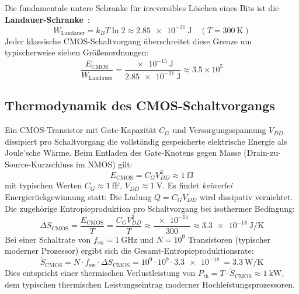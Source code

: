 ﻿\documentclass[12pt, a4paper]{report}
\theoremstyle{definition}
\theoremstyle{remark}
\begin{document}
Die fundamentale untere Schranke für irreversibles Löschen eines Bits ist
die \textbf{Landauer-Schranke}~\cite{landauer1961}:
\begin{equation}
  W_\text{Landauer} = k_B T \ln 2
  \approx \SI{2.85e-21}{\joule}
  \quad (T = \SI{300}{\kelvin})
  \label{eq:landauer}
\end{equation}
Jeder klassische CMOS-Schaltvorgang überschreitet diese Grenze um typischerweise
sieben Größenordnungen:
\begin{equation}
  \frac{E_\text{CMOS}}{W_\text{Landauer}}
  = \frac{\SI{e-15}{\joule}}{\SI{2.85e-21}{\joule}}
  \approx 3.5 \times 10^5
  \label{eq:cmos_landauer_ratio}
\end{equation}

\subsection{Thermodynamik des CMOS-Schaltvorgangs}

Ein CMOS-Transistor mit Gate-Kapazität $C_G$ und Versorgungsspannung $V_{DD}$
dissipiert pro Schaltvorgang die vollständig gespeicherte elektrische Energie
als Joule'sche Wärme. Beim Entladen des Gate-Knotens gegen Masse
(Drain-zu-Source-Kurzschluss im NMOS) gilt:
\begin{equation}
  E_\text{CMOS} = C_G V_{DD}^2
  \approx \SI{1}{\femto\joule}
  \label{eq:e_cmos}
\end{equation}
mit typischen Werten $C_G \approx \SI{1}{\femto\farad}$,
$V_{DD} \approx \SI{1}{\volt}$.
Es findet \emph{keinerlei} Energierückgewinnung statt: Die Ladung
$Q = C_G V_{DD}$ wird dissipativ vernichtet. Die zugehörige Entropieproduktion
pro Schaltvorgang bei isothermer Bedingung:
\begin{equation}
  \Delta S_\text{CMOS}
  = \frac{E_\text{CMOS}}{T}
  = \frac{C_G V_{DD}^2}{T}
  \approx \frac{\SI{e-15}{}}{300}
  \approx \SI{3.3e-18}{\joule\per\kelvin}
  \label{eq:ds_cmos}
\end{equation}
Bei einer Schaltrate von $f_\text{sw} = \SI{1}{\giga\hertz}$ und
$N = 10^9$ Transistoren (typischer moderner Prozessor) ergibt sich die
Gesamt-Entropieproduktionsrate:
\begin{equation}
  \dot{S}_\text{CMOS}
  = N \cdot f_\text{sw} \cdot \Delta S_\text{CMOS}
  = 10^9 \cdot 10^9 \cdot \SI{3.3e-18}{}
  = \SI{3.3}{\watt\per\kelvin}
  \label{eq:sdot_cmos}
\end{equation}
Dies entspricht einer thermischen Verlustleistung von
$P_\text{th} = T \cdot \dot{S}_\text{CMOS} \approx \SI{1}{\kilo\watt}$,
dem typischen thermischen Leistungseintrag moderner Hochleistungsprozessoren.
\end{document}
